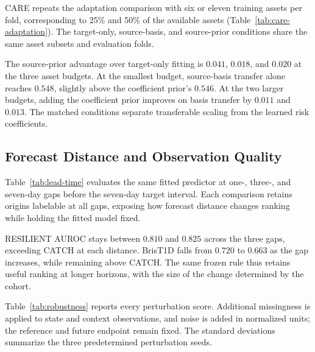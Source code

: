 CARE repeats the adaptation comparison with six or eleven training assets per fold, corresponding to 25\% and 50\% of the available assets (Table~\ref{tab:care-adaptation}). The target-only, source-basis, and source-prior conditions share the same asset subsets and evaluation folds.
\begin{table}[!htb]
\centering
\caption{CARE adaptation with matched training-asset budgets.}
\label{tab:care-adaptation}
\end{table}

The source-prior advantage over target-only fitting is $0.041$, $0.018$, and $0.020$ at the three asset budgets. At the smallest budget, source-basis transfer alone reaches $0.548$, slightly above the coefficient prior's $0.546$. At the two larger budgets, adding the coefficient prior improves on basis transfer by $0.011$ and $0.013$. The matched conditions separate transferable scaling from the learned risk coefficients.

\subsection{Forecast Distance and Observation Quality}
Table~\ref{tab:lead-time} evaluates the same fitted predictor at one-, three-, and seven-day gaps before the seven-day target interval. Each comparison retains origins labelable at all gaps, exposing how forecast distance changes ranking while holding the fitted model fixed.
\begin{table}[!htb]
\centering
\caption{Seven-day target intervals at three forecast gaps. Models are frozen from the one-day-gap task.}
\label{tab:lead-time}
\end{table}

RESILIENT AUROC stays between $0.810$ and $0.825$ across the three gaps, exceeding CATCH at each distance. BrisT1D falls from $0.720$ to $0.663$ as the gap increases, while remaining above CATCH. The same frozen rule thus retains useful ranking at longer horizons, with the size of the change determined by the cohort.

Table~\ref{tab:robustness} reports every perturbation score. Additional missingness is applied to state and context observations, and noise is added in normalized units; the reference and future endpoint remain fixed. The standard deviations summarize the three predetermined perturbation seeds.
\begin{table}[!htb]
\centering
\caption{Observation perturbations: AUROC mean and standard deviation over three seeds.}
\label{tab:robustness}
\end{table}
